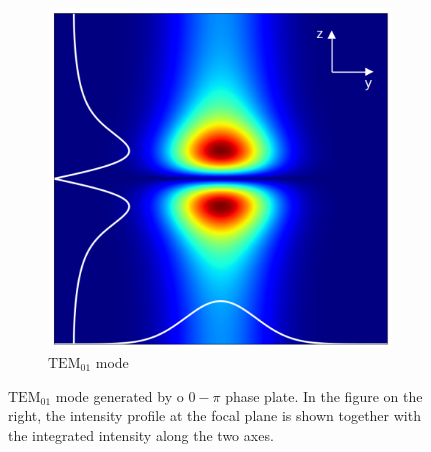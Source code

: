 \begin{figure}
\begin{subfigure}[t]{0.6\textwidth}
        \includegraphics[height=\textwidth, valign=c]{chapters/chapter_2/figures/tem10_sim.png}
        \caption{$\text{TEM}_{01}$ mode}
        \label{fig:tem10}
    \end{subfigure}
    \caption{$\text{TEM}_{01}$ mode generated by o $0-\pi$ phase plate. In the figure on the right, the intensity profile at the focal plane is shown together with the integrated intensity along the two axes.}
    \label{fig:0pi}
\end{figure}

